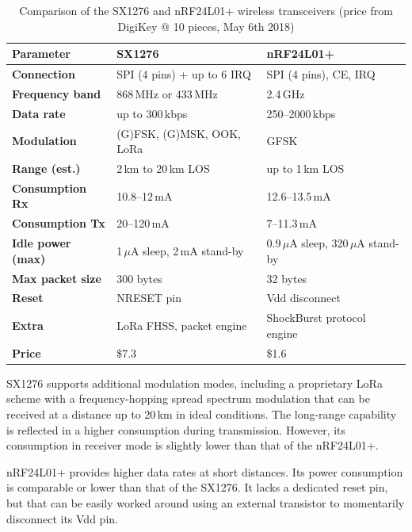 \begin{table}[h]
	\centering
	\begin{tabulary}{\textwidth}{lLL}
		\toprule
		\textbf{Parameter} & \textbf{SX1276} & \textbf{nRF24L01+} \\
		\midrule
		\textbf{Connection} & SPI (4 pins) + up to 6 IRQ & SPI (4 pins), CE, IRQ \\
		\textbf{Frequency band} & 868\,MHz or 433\,MHz & 2.4\,GHz \\
		\textbf{Data rate} & up to 300\,kbps & 250--2000\,kbps \\
		\textbf{Modulation} & (G)FSK, (G)MSK, OOK, LoRa & GFSK \\
		\textbf{Range (est.)} & 2\,km to 20\,km LOS & up to 1\,km LOS \\
		\textbf{Consumption Rx} & 10.8--12\,mA & 12.6--13.5\,mA \\
		\textbf{Consumption Tx} & 20--120\,mA & 7--11.3\,mA \\
		\textbf{Idle power (max)} & 1\,$\mu$A sleep, 2\,mA stand-by & 0.9\,$\mu$A sleep, 320\,$\mu$A stand-by \\
		\textbf{Max packet size} & 300 bytes & 32 bytes \\
		\textbf{Reset} & NRESET pin & Vdd disconnect \\
		\textbf{Extra} & LoRa FHSS, packet engine & ShockBurst protocol engine \\
		\textbf{Price} & \$7.3 & \$1.6 \\
		\bottomrule
	\end{tabulary}
	\caption[Comparison of the SX1276 and nRF24L01+ wireless transceivers]{\label{fig:nrf-sx-comparison}Comparison of the SX1276 and nRF24L01+ wireless transceivers (price from DigiKey @ 10 pieces, May 6th 2018)}
\end{table}

SX1276 supports additional modulation modes, including a proprietary LoRa scheme with a frequency-hopping spread spectrum modulation that can be received at a distance up to 20\,km in ideal conditions. The long-range capability is reflected in a higher consumption during transmission. However, its consumption in receiver mode is slightly lower than that of the nRF24L01+.

nRF24L01+ provides higher data rates at short distances. Its power consumption is comparable or lower than that of the SX1276. It lacks a dedicated reset pin, but that can be easily worked around using an external transistor to momentarily disconnect its Vdd pin.

